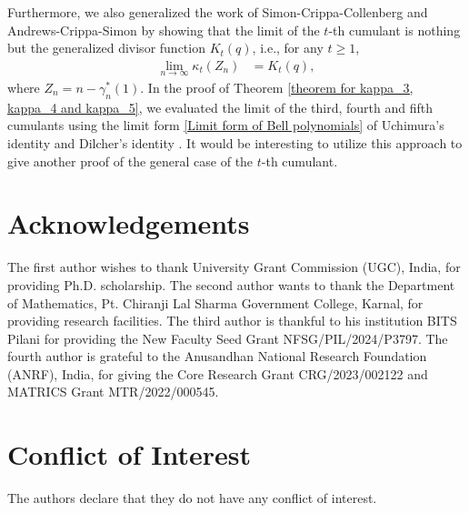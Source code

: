 \documentclass[11pt,reqno]{amsart}
\renewcommand{\(}{\left\(}
\renewcommand{\)}{\right\)}
\renewcommand{\[}{\left\[}
\renewcommand{\]}{\right\]}
\numberwithin{equation}{section}
\theoremstyle{plain}
\begin{document}
Furthermore,  we also generalized the work of Simon-Crippa-Collenberg and  Andrews-Crippa-Simon by showing that the limit of the $t$-th cumulant is nothing but the generalized divisor function $K_t(q)$,  i.e.,  for any $t \geq 1$,  
\begin{align*}
\lim_{n\rightarrow \infty}\kappa_t(Z_n)&= K_t(q),
\end{align*}
where $Z_n= n-  \gamma_n^*(1)$.   In the proof of Theorem \ref{theorem for kappa_3, kappa_4 and kappa_5},  we evaluated the limit of the third,  fourth and fifth cumulants using the limit form \eqref{Limit form of Bell polynomials}  of Uchimura's identity and Dilcher's identity \cite[p.~85,  Equations (2.1)--(2.3)]{dilcher}.  It would be interesting to utilize this approach to give another proof of the general case of the $t$-th cumulant.    






\section*{Acknowledgements}  The first author wishes to thank University Grant Commission (UGC), India, for providing Ph.D. scholarship.  The second author wants to thank the Department of Mathematics, Pt. Chiranji Lal Sharma Government College, Karnal, for providing research facilities. The third author is thankful to his institution BITS Pilani for providing the New Faculty Seed Grant NFSG/PIL/2024/P3797. The fourth author is grateful to the Anusandhan National Research Foundation (ANRF),  India, for giving the Core Research Grant CRG/2023/002122 and MATRICS Grant MTR/2022/000545.   
\\

\section*{Conflict of Interest}
The authors declare that they do not have any conflict of interest.  
\end{document}
